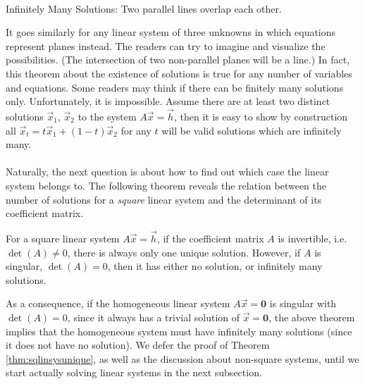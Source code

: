 \begin{center}
 \\
Infinitely Many Solutions: Two parallel lines overlap each other. 
\end{center}
It goes similarly for any linear system of three unknowns in which equations represent planes instead. The readers can try to imagine and visualize the possibilities. (The intersection of two non-parallel planes will be a line.) In fact, this theorem about the existence of solutions is true for any number of variables and equations. Some readers may think if there can be finitely many solutions only. Unfortunately, it is impossible. Assume there are at least two distinct solutions $\vec{x}_1$, $\vec{x}_2$ to the system $A\vec{x} = \vec{h}$, then it is easy to show by construction all $\vec{x}_t = t\vec{x}_1 + (1-t)\vec{x}_2$ for any $t$ will be valid solutions which are infinitely many. \\ 
\\
Naturally, the next question is about how to find out which case the linear system belongs to. The following theorem reveals the relation between the number of solutions for a \textit{square} linear system and the determinant of its coefficient matrix.
\begin{thm}
\label{thm:sqlinsysunique}
For a square linear system $A\vec{x} = \vec{h}$, if the coefficient matrix $A$ is invertible, i.e. $\det(A) \neq 0$, there is always only one unique solution. However, if $A$ is singular, $\det(A) = 0$, then it has either no solution, or infinitely many solutions.
\end{thm}
As a consequence, if the homogeneous linear system $A\vec{x} = \textbf{0}$ is singular with $\det(A) = 0$, since it always has a trivial solution of $\vec{x} = \textbf{0}$, the above theorem implies that the homogeneous system must have infinitely many solutions (since it does not have no solution). We defer the proof of Theorem \ref{thm:sqlinsysunique}, as well as the discussion about non-square systems, until we start actually solving linear systems in the next subsection. \\
